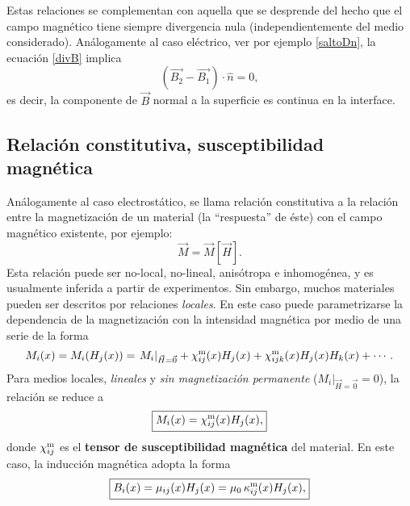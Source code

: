 Estas relaciones se complementan con aquella que se desprende del hecho que el campo magnético tiene siempre divergencia nula (independientemente del medio considerado). Análogamente al caso eléctrico, ver por ejemplo \eqref{saltoDn}, la ecuación \eqref{divB} implica 
\begin{equation}\label{saltoBn}
\boxed{\left(\vec{B_2}-\vec{B_1}\right)\cdot\hat{n}=0,}
\end{equation}
es decir, la componente de $\vec{B}$ normal a la superficie es continua en la interface.

\subsection{Relación constitutiva, susceptibilidad magnética}
Análogamente al caso electrostático, se llama relación constitutiva a la
relación entre la magnetización de un material (la ``respuesta'' de éste)
con el campo magnético existente, por ejemplo:
\begin{equation}
 \vec{M}=\vec{M}[\vec{H}].
\end{equation}
Esta relación puede ser no-local, no-lineal, anisótropa e inhomogénea, y es usualmente inferida a partir de experimentos. Sin
embargo, muchos materiales pueden ser descritos por relaciones \textit{locales}. En
este caso puede parametrizarse la dependencia de la magnetización con la
intensidad magnética por medio de una serie de la forma
\begin{equation}
M_i(x)=M_i(H_j(x))=\left.M_i\right|_{\vec{H}=\vec{0}}
+\chi^{\rm m}_{ij}(x)H_j(x)+\chi^{\rm m}_{ijk}(x)H_j(x)H_k(x)+\cdots.
\end{equation}
Para medios locales, \textit{lineales} y \textit{sin magnetización permanente}
($\left.M_i\right|_{\vec{H}=\vec{0}}=0$), la relación se reduce a
\begin{equation}
 \boxed{M_i(x)=\chi^{\rm m}_{ij}(x)H_j(x),}
\end{equation}
donde $\chi^{\rm m}_{ij}$ es el \textbf{tensor de susceptibilidad magnética} del
material. En este caso, la inducción magnética adopta la forma
\begin{equation}
 \boxed{B_i(x)=\mu_{ij}(x)H_j(x)=\mu_0\,\kappa^{\rm m}_{ij}(x)H_j(x),}
\end{equation}
